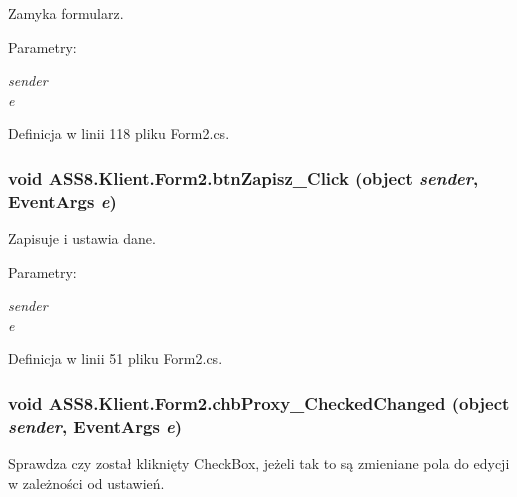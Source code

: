 Zamyka formularz. 

\begin{Desc}
\item[Parametry:]
\begin{description}
\item[{\em sender}]\item[{\em e}]\end{description}
\end{Desc}


Definicja w linii 118 pliku Form2.cs.\hypertarget{a00004_7e564cde1dca7d07ae2e0fd2ed7de14f}{
\subsubsection[{btnZapisz\_\-Click}]{\setlength{\rightskip}{0pt plus 5cm}void ASS8.Klient.Form2.btnZapisz\_\-Click (object {\em sender}, \/  EventArgs {\em e})}}
\label{d0/d0b/a00004_7e564cde1dca7d07ae2e0fd2ed7de14f}


Zapisuje i ustawia dane. 

\begin{Desc}
\item[Parametry:]
\begin{description}
\item[{\em sender}]\item[{\em e}]\end{description}
\end{Desc}


Definicja w linii 51 pliku Form2.cs.\hypertarget{a00004_783009da735c7b89fe61f2dd123af5b4}{
\subsubsection[{chbProxy\_\-CheckedChanged}]{\setlength{\rightskip}{0pt plus 5cm}void ASS8.Klient.Form2.chbProxy\_\-CheckedChanged (object {\em sender}, \/  EventArgs {\em e})}}
\label{d0/d0b/a00004_783009da735c7b89fe61f2dd123af5b4}


Sprawdza czy został kliknięty CheckBox, jeżeli tak to są zmieniane pola do edycji w zależności od ustawień. 

